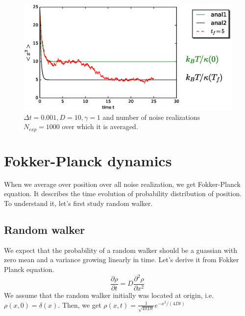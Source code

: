 \documentclass[11pt,a4paper]{article}
\begin{document}
\begin{figure}[!htbp]
\centering
\includegraphics[scale=0.67]{ramp_anal.eps}
\caption{ $\Delta t=0.001, D=10, \gamma=1$  and number of noise realizations $N_{exp}=1000$ over which it is averaged. }
\label{sigma_ramp_anal}
\end{figure}

\newpage
\section{Fokker-Planck dynamics}
When we average over position over all noise realization, we get Fokker-Planck equation. It describes the time evolution of  probability distribution of position. To understand it, let's first study random walker.

\subsection*{Random walker}
We expect that the probability of a random walker should be a guassian with zero mean and a variance growing linearly in time. Let's derive it from Fokker Planck equation. 
\begin{equation}
\dfrac{\partial \rho}{\partial t} =  D \dfrac{\partial^2 \rho}{\partial x^2} 
\end{equation}
We assume that the random walker initially was located at origin, i.e. $\rho(x,0) = \delta(x)$. Then, we get $\rho (x,t) = \frac{1}{\sqrt{4  \pi D  t}}e^{-{x^2}/({4 Dt})}$ 
\end{document}
